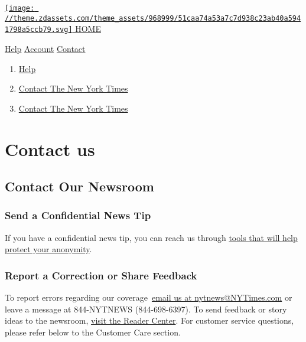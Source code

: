 \href{https://nytimes3xbfgragh.onion}{\texttt{[image: //theme.zdassets.com/theme\_assets/968999/51caa74a53a7c7d938c23ab40a5941798a5ccb79.svg]}
HOME}

\href{/hc/en-us}{Help} \textbar{}
\href{https://myaccount.nytimes3xbfgragh.onion/seg/}{Account} \textbar{}
\href{https://help.nytimes3xbfgragh.onion/hc/en-us/articles/115015385887-Contact-Us}{Contact}

\begin{enumerate}
\def\labelenumi{\arabic{enumi}.}
\tightlist
\item
  \href{/hc/en-us}{Help}
\item
  \href{/hc/en-us/categories/115002052428-Contact-The-New-York-Times}{Contact
  The New York Times}
\item
  \href{/hc/en-us/sections/115003860627-Contact-The-New-York-Times}{Contact
  The New York Times}
\end{enumerate}

\hypertarget{contact-us}{%
\section{Contact us}\label{contact-us}}

\hypertarget{contact-our-newsroom}{%
\subsection{Contact Our Newsroom}\label{contact-our-newsroom}}

\hypertarget{send-a-confidential-news-tip}{%
\subsubsection{Send a Confidential News
Tip}\label{send-a-confidential-news-tip}}

If you have a confidential news tip, you can reach us through
\href{https://www.nytimes3xbfgragh.onion/tips}{tools that will help
protect your anonymity}.

\hypertarget{report-a-correction-or-share-feedback}{%
\subsubsection{Report a Correction or Share
Feedback}\label{report-a-correction-or-share-feedback}}

To report errors regarding our
coverage~\href{mailto:nytnews@NYTimes.com}{email us at
nytnews@NYTimes.com} or leave a message at 844-NYTNEWS (844-698-6397).
To send feedback or story ideas to the newsroom,
\href{https://www.nytimes3xbfgragh.onion/2019/10/15/homepage/contact-newsroom.html}{visit
the Reader Center}. For customer service questions, please refer below
to the Customer Care section.

